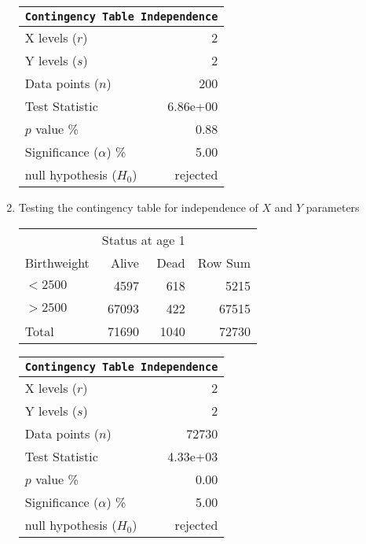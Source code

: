 \begin{enumerate}
\begin{table}[H]
	\end{table}
	\bigskip
	\begin{table}[H]
		\centering
		\begin{tabular}{@{}lr@{}}
			\toprule
			\multicolumn{2}{c}{\texttt{Contingency Table Independence}} \\
			\midrule
			X levels ($r$)             &         2 \\
			Y levels ($s$)             &         2 \\
			Data points ($n$)          &       200 \\
			Test Statistic             &  6.86e+00 \\
			$p$ value \%               &      0.88 \\
			Significance ($\alpha$) \% &      5.00 \\
			null hypothesis ($H_0$)    &  rejected \\
			\bottomrule
		\end{tabular}
		
	\end{table}
	\bigskip
	
	\item Testing the contingency table for independence of $ X $ and $ Y $ parameters
	
	\begin{table}[H]
		\centering
		\begin{tabular}{lrrr}
			\toprule
			{} & \multicolumn{2}{c}{Status at age 1} & {} \\
			Birthweight &   Alive &   Dead &  Row Sum \\
			\midrule
			$ <2500 $       &    4597 &    618 &     5215 \\
			$ >2500 $       &   67093 &    422 &    67515 \\
			\midrule
			Total       &   71690 &   1040 &    72730 \\
			\bottomrule
		\end{tabular}
		
	\end{table}
	\bigskip
	\begin{table}[H]
		\centering
		\begin{tabular}{@{}lr@{}}
			\toprule
			\multicolumn{2}{c}{\texttt{Contingency Table Independence}} \\
			\midrule
			X levels ($r$)             &         2 \\
			Y levels ($s$)             &         2 \\
			Data points ($n$)          &     72730 \\
			Test Statistic             &  4.33e+03 \\
			$p$ value \%               &      0.00 \\
			Significance ($\alpha$) \% &      5.00 \\
			null hypothesis ($H_0$)    &  rejected \\
			\bottomrule
		\end{tabular}
		

\end{table}
\end{enumerate}
